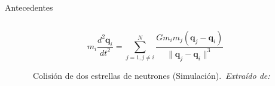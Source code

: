 \begin{frame}{Antecedentes}
\begin{columns}
\begin{column}{0.6\textwidth}
            \vspace{0.1cm}
            \[m_i \frac{d^2 \mathbf{q}_i}{dt^2} = \sum_{j=1, j \neq i}^{N} \frac{G m_i m_j (\mathbf{q}_j - \mathbf{q}_i)}{\|\mathbf{q}_j - \mathbf{q}_i\|^3} \]
            \vspace{0cm}
            \begin{figure}[H]
                \centering
                \href{run:C:/Users/emicr/Documents/ESCOLARES/ESCOM/TRABAJO TERMINAL/Presentacion/img/introduccion/Neutron_Star_Merger_high.mp4}{%
                }
                \vspace{-0.25cm}
                \caption{\tiny~Colisión de dos estrellas de neutrones (Simulación).~\textit{Extraído de:}~\cite{nasa_star_collision_2018}}%
                \label{fig:neutron_star_merger}
            \end{figure}
        \end{column}
    \end{columns}
\end{frame}

